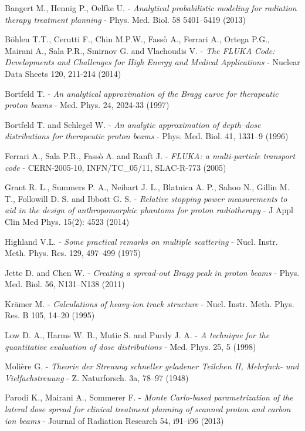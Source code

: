 \documentclass[12pt, a4paper, twoside]{book}
\begin{document}
\begin{thebibliography}{99}

Bangert M., Hennig P., Oelfke U. -
\emph{Analytical probabilistic modeling for radiation therapy treatment planning} - 
Phys. Med. Biol. 58 5401–5419 (2013)

Böhlen T.T., Cerutti F., Chin M.P.W., Fassò A., Ferrari  A., Ortega P.G., Mairani A., Sala P.R., Smirnov G. and Vlachoudis V. -
\emph{The FLUKA Code: Developments and Challenges for High Energy and Medical Applications} -
Nuclear Data Sheets 120, 211-214 (2014) 

Bortfeld T. -
\emph{An analytical approximation of the Bragg curve for therapeutic proton beams} -
Med. Phys. 24, 2024-33 (1997)

Bortfeld T. and Schlegel W. -
\emph{An analytic approximation of depth–dose distributions for therapeutic proton beams} -
Phys. Med. Biol. 41, 1331–9 (1996)

Ferrari A., Sala P.R., Fassò A. and Ranft J. -
\emph{FLUKA: a multi-particle transport code} -
CERN-2005-10, INFN/TC\_05/11, SLAC-R-773 (2005)

Grant R. L., Summers P. A., Neihart J. L., Blatnica A. P., Sahoo N., Gillin M. T., Followill D. S. and Ibbott G. S. -
\emph{Relative stopping power measurements to aid in the design of anthropomorphic phantoms for proton radiotherapy} -
J Appl Clin Med Phys. 15(2): 4523 (2014)

Highland V.L. -
\emph{Some practical remarks on multiple scattering} -
Nucl. Instr. Meth. Phys. Res. 129, 497–499 (1975)

Jette D. and Chen W. - 
\emph{Creating a spread-out Bragg peak in proton beams} -
Phys. Med. Biol. 56, N131–N138 (2011)

Krämer M. - 
\emph{Calculations of heavy-ion track structure} - 
Nucl. Instr. Meth. Phys. Res. B 105, 14–20 (1995)

Low D. A., Harms W. B., Mutic S. and Purdy J. A. -
\emph{A technique for the quantitative evaluation of dose distributions} -
Med. Phys. 25, 5 (1998)

Molière G. -
\emph{Theorie der Streuung schneller geladener Teilchen II, Mehrfach- und Vielfachstreuung} - 
Z. Naturforsch. 3a, 78–97 (1948)

Parodi K., Mairani A., Sommerer F. -
\emph{Monte Carlo-based parametrization of the lateral dose spread for clinical treatment planning of scanned proton and carbon ion beams} -
Journal of Radiation Research 54, i91–i96 (2013)


\end{thebibliography}
\end{document}

